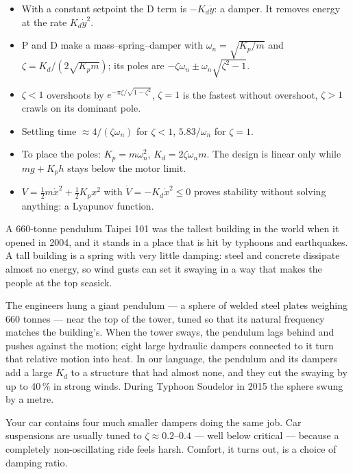 \begin{remember}
\begin{itemize}
  \item With a constant setpoint the D term is $-K_d\dot y$: a damper. It removes energy at the rate $K_d\dot y^2$.
  \item P and D make a mass–spring–damper with $\omega_n = \sqrt{K_p/m}$ and $\zeta = K_d/(2\sqrt{K_p m})$; its poles are $-\zeta\omega_n \pm \omega_n\sqrt{\zeta^2-1}$.
  \item $\zeta<1$ overshoots by $e^{-\pi\zeta/\sqrt{1-\zeta^2}}$, $\zeta=1$ is the fastest without overshoot, $\zeta>1$ crawls on its dominant pole.
  \item Settling time $\approx 4/(\zeta\omega_n)$ for $\zeta<1$, $5.83/\omega_n$ for $\zeta=1$.
  \item To place the poles: $K_p = m\omega_n^2$, $K_d = 2\zeta\omega_n m$. The design is linear only while $mg + K_p h$ stays below the motor limit.
  \item $V = \tfrac12 m\dot x^2 + \tfrac12 K_p x^2$ with $\dot V = -K_d\dot x^2 \le 0$ proves stability without solving anything: a Lyapunov function.
\end{itemize}
\end{remember}

\begin{curiosity}{A 660-tonne pendulum}
Taipei 101 was the tallest building in the world when it opened in 2004, and it stands in a place that is hit by typhoons and earthquakes. A tall building is a spring with very little damping: steel and concrete dissipate almost no energy, so wind gusts can set it swaying in a way that makes the people at the top seasick.

The engineers hung a giant pendulum — a sphere of welded steel plates weighing 660 tonnes — near the top of the tower, tuned so that its natural frequency matches the building's. When the tower sways, the pendulum lags behind and pushes against the motion; eight large hydraulic dampers connected to it turn that relative motion into heat. In our language, the pendulum and its dampers add a large $K_d$ to a structure that had almost none, and they cut the swaying by up to 40\,\% in strong winds. During Typhoon Soudelor in 2015 the sphere swung by a metre.

Your car contains four much smaller dampers doing the same job. Car suspensions are usually tuned to $\zeta \approx 0.2$–$0.4$ — well below critical — because a completely non-oscillating ride feels harsh. Comfort, it turns out, is a choice of damping ratio.
\end{curiosity}

